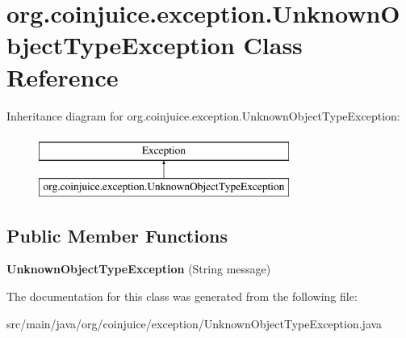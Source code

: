 \hypertarget{classorg_1_1coinjuice_1_1exception_1_1_unknown_object_type_exception}{\section{org.\-coinjuice.\-exception.\-Unknown\-Object\-Type\-Exception Class Reference}
\label{classorg_1_1coinjuice_1_1exception_1_1_unknown_object_type_exception}
}
Inheritance diagram for org.\-coinjuice.\-exception.\-Unknown\-Object\-Type\-Exception\-:\begin{figure}[H]
\begin{center}
\leavevmode
\includegraphics[height=2.000000cm]{classorg_1_1coinjuice_1_1exception_1_1_unknown_object_type_exception}
\end{center}
\end{figure}
\subsection*{Public Member Functions}
\begin{DoxyCompactItemize}
\item 
\hypertarget{classorg_1_1coinjuice_1_1exception_1_1_unknown_object_type_exception_abae86d02617787d5b7d7e066d620bf2e}{{\bfseries Unknown\-Object\-Type\-Exception} (String message)}\label{classorg_1_1coinjuice_1_1exception_1_1_unknown_object_type_exception_abae86d02617787d5b7d7e066d620bf2e}

\end{DoxyCompactItemize}


The documentation for this class was generated from the following file\-:\begin{DoxyCompactItemize}
\item 
src/main/java/org/coinjuice/exception/Unknown\-Object\-Type\-Exception.\-java\end{DoxyCompactItemize}
